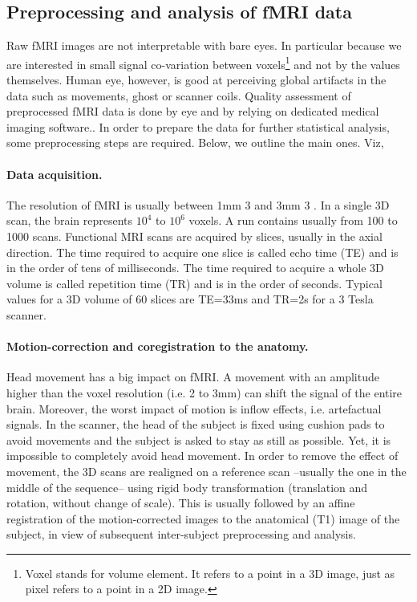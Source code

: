 \subsection{Preprocessing and analysis of fMRI data}
Raw fMRI images are not interpretable with bare eyes. In particular because
we are interested in small signal co-variation between voxels\footnote{Voxel stands for volume element. It refers
to a point in a 3D image, just as pixel refers to a point in a 2D image.}  and not by the
values themselves. Human eye, however, is good at perceiving global artifacts
in the data such as movements, ghost or scanner coils. Quality assessment of
preprocessed fMRI data is done by eye and by relying on dedicated medical
imaging software.. In order to prepare the data for further statistical analysis,
some preprocessing steps are required. Below, we outline the main ones. Viz,

\paragraph{Data acquisition.}
The resolution of fMRI is usually between 1mm 3 and
3mm 3 . In a single 3D scan, the brain represents $10^4$ to $10^6$ voxels.
A run contains usually from 100 to 1000 scans. Functional MRI scans are
acquired by slices, usually in the axial direction. The time required to acquire
one slice is called echo time (TE) and is in the order of tens of milliseconds.
The time required to acquire a whole 3D volume is called repetition time (TR)
and is in the order of seconds. Typical values for a 3D volume of 60 slices are
TE=33ms and TR=2s for a 3 Tesla scanner.

\paragraph{Motion-correction and coregistration to the anatomy.}
Head movement has a big impact on fMRI. A movement
with an amplitude higher than the voxel resolution (i.e. 2 to 3mm) can
shift the signal of the entire brain. Moreover, the worst impact of motion is
inflow effects, i.e. artefactual signals. In the scanner, the head of the subject is
fixed using cushion pads to avoid movements and the subject is asked to stay
as still as possible. Yet, it is impossible to completely avoid head movement.
In order to remove the effect of movement, the 3D scans are realigned on a
reference scan --usually the one in the middle of the sequence-- using rigid
body transformation (translation and rotation, without change of scale).
This is usually followed by an affine registration of the motion-corrected images to
the anatomical (T1) image of the subject, in view of subsequent inter-subject preprocessing and analysis.

